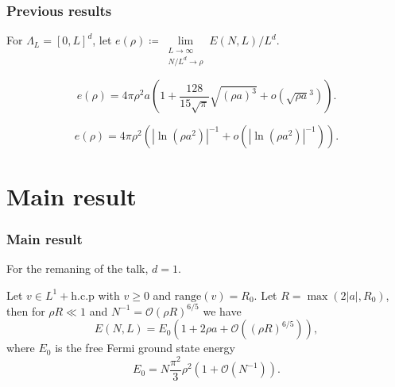 \documentclass{beamer}[10]
\newcommand{\abs}[1]{\left\lvert #1 \right\rvert}
\begin{document}
\begin{frame}
\frametitle{Previous results}
\begin{block}{}
	For $ \Lambda_L=[0,L]^d $, let $ e(\rho)\coloneqq\lim\limits_{\substack{L\to\infty\\ N/L^{d}\to\rho}}E(N,L)/L^{d} $.
	\begin{Theorem}[$ d=3 $ result, Lee-Huang-Yang]
		\begin{equation}
		e(\rho)=4\pi\rho^2 a\left(1+\frac{128}{15\sqrt{\pi}}\sqrt{(\rho a)^3}+o(\sqrt{\rho a}^3)\right).
		\end{equation}
	\end{Theorem}

	\begin{theorem}[$ d=2 $ result]
		\begin{equation}
		e(\rho)=4\pi \rho^2\left(\abs{\ln(\rho a^2)}^{-1}+o(\abs{\ln(\rho a^2)}^{-1})\right) .
		\end{equation}
	\end{theorem}
\end{block}
\end{frame}


\section{Main result}

\begin{frame}
	\frametitle{Main result}
	\begin{block}{}
		For the remaning of the talk, $ d=1 $.
		\begin{theorem}
			Let $ v\in L^{1}+\text{h.c.p} $ with $ v\geq0 $ and $ \text{range}(v)=R_0 $. Let $ R=\max(2\abs{a},R_0) $, then for $ \rho R\ll 1  $ and $ N^{-1}=\mathcal{O}(\rho R)^{6/5} $ we have \begin{equation}
			E(N,L)=E_0\left(1+2\rho a+ \mathcal{O}\left((\rho R)^{6/5}\right)\right),
			\end{equation} 
			where $ E_0 $ is the free Fermi ground state energy\begin{equation}
			E_0=N\frac{\pi^2}{3}\rho^2\left(1+\mathcal{O}(N^{-1})\right).
			\end{equation}
		\end{theorem}
	\end{block}	
\end{frame}
\end{document}
